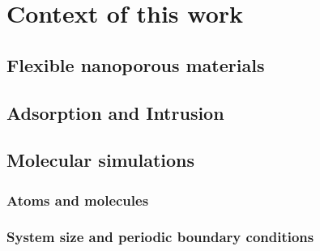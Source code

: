 \documentclass[thesis]{subfiles}
\begin{document}
\chapter{Context of this work}
\startcontents[chapters]
\printpartialtoc

\section{Flexible nanoporous materials}


%

\section{Adsorption and Intrusion}

\section{Molecular simulations}

\subsection{Atoms and molecules}

\subsection{System size and periodic boundary conditions}

\OnlyInSubfile{\printbibliography}
\end{document}
